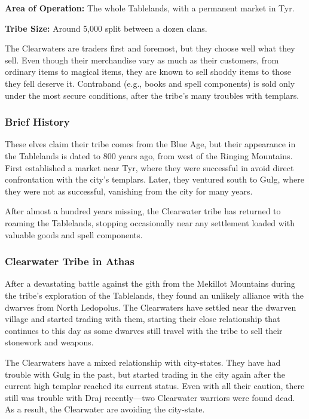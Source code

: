 \textbf{Area of Operation:} The whole Tablelands, with a permanent market in Tyr.

\textbf{Tribe Size:} Around 5,000 split between a dozen clans.

The Clearwaters are traders first and foremost, but they choose well what they sell. Even though their merchandise vary as much as their customers, from ordinary items to magical items, they are known to sell shoddy items to those they fell deserve it. Contraband (e.g., books and spell components) is sold only under the most secure conditions, after the tribe's many troubles with templars.

\subsubsection{Brief History}
These elves claim their tribe comes from the Blue Age, but their appearance in the Tablelands is dated to 800 years ago, from west of the Ringing Mountains. First established a market near Tyr, where they were successful in avoid direct confrontation with the city's templars. Later, they ventured south to Gulg, where they were not as successful, vanishing from the city for many years.

After almost a hundred years missing, the Clearwater tribe has returned to roaming the Tablelands, stopping occasionally near any settlement loaded with valuable goods and spell components.

\subsubsection{Clearwater Tribe in Athas}
After a devastating battle against the gith from the Mekillot Mountains during the tribe's exploration of the Tablelands, they found an unlikely alliance with the dwarves from North Ledopolus. The Clearwaters have settled near the dwarven village and started trading with them, starting their close relationship that continues to this day as some dwarves still travel with the tribe to sell their stonework and weapons.

The Clearwaters have a mixed relationship with city-states. They have had trouble with Gulg in the past, but started trading in the city again after the current high templar reached its current status. Even with all their caution, there still was trouble with Draj recently---two Clearwater warriors were found dead. As a result, the Clearwater are avoiding the city-state.

